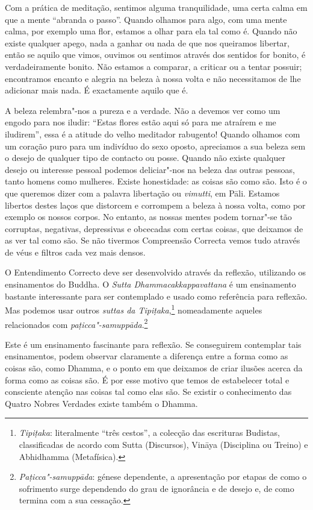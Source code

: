 \sectionBreak

Com a prática de meditação, sentimos alguma tranquilidade, uma certa calma em
que a mente “abranda o passo”. Quando olhamos para algo, com uma mente calma,
por exemplo uma flor, estamos a olhar para ela tal como é. Quando não existe
qualquer apego, nada a ganhar ou nada de que nos queiramos libertar, então se
aquilo que vimos, ouvimos ou sentimos através dos sentidos for bonito, é
verdadeiramente bonito. Não estamos a comparar, a criticar ou a tentar possuir;
encontramos encanto e alegria na beleza à nossa volta e não necessitamos de lhe
adicionar mais nada. É exactamente aquilo que é.

A beleza relembra"-nos a pureza e a verdade. Não a devemos ver como um engodo
para nos iludir: “Estas flores estão aqui só para me atraírem e me iludirem”,
essa é a atitude do velho meditador rabugento! Quando olhamos com um coração
puro para um indivíduo do sexo oposto, apreciamos a sua beleza sem o desejo de
qualquer tipo de contacto ou posse. Quando não existe qualquer desejo ou
interesse pessoal podemos deliciar"-nos na beleza das outras pessoas, tanto
homens como mulheres. Existe honestidade: as coisas são como são. Isto é o que
queremos dizer com a palavra libertação ou \emph{vimutti}, em Pāli. Estamos
libertos destes laços que distorcem e corrompem a beleza à nossa volta, como por
exemplo os nossos corpos. No entanto, as nossas mentes podem tornar"-se tão
corruptas, negativas, depressivas e obcecadas com certas coisas, que deixamos de
as ver tal como são. Se não tivermos Compreensão Correcta vemos tudo através de
véus e filtros cada vez mais densos.

O Entendimento Correcto deve ser desenvolvido através da reflexão, utilizando os
ensinamentos do Buddha. O \emph{Sutta Dhammacakkappavattana} é um ensinamento
bastante interessante para ser contemplado e usado como referência para
reflexão. Mas podemos usar outros \emph{suttas da Tipiṭaka},\footnote{%
  \emph{Tipiṭaka}: literalmente “três cestos”, a colecção das escrituras
  Budistas, classificadas de acordo com Sutta (Discursos), Vināya (Disciplina ou
  Treino) e Abhidhamma (Metafísica).} nomeadamente aqueles relacionados com
\emph{paṭicca"-samuppāda}.\footnote{%
  \emph{Paṭicca"-samuppāda}: génese dependente, a apresentação por etapas de como
  o sofrimento surge dependendo do grau de ignorância e de desejo e, de como
  termina com a sua cessação.}

Este é um ensinamento fascinante para reflexão.
Se conseguirem contemplar tais ensinamentos, podem observar claramente a
diferença entre a forma como as coisas são, como Dhamma, e o ponto em que
deixamos de criar ilusões acerca da forma como as coisas são. É por esse motivo
que temos de estabelecer total e consciente atenção nas coisas tal como elas
são. Se existir o conhecimento das Quatro Nobres Verdades existe também o
Dhamma.

